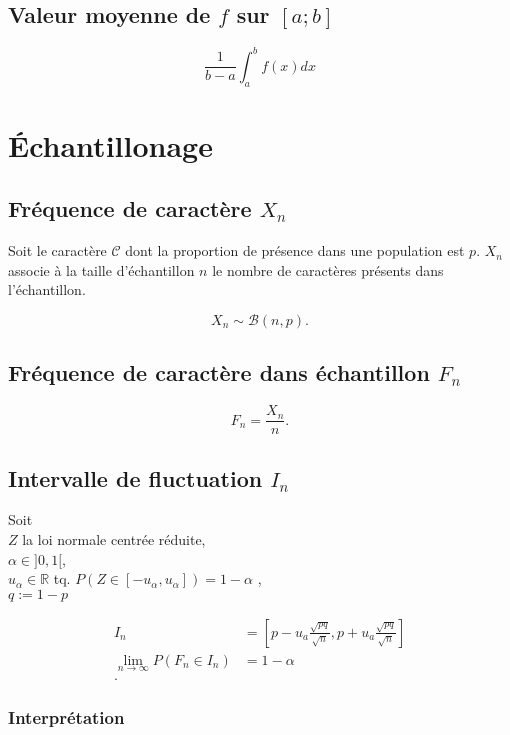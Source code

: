 \documentclass{article}
\newcommand{\R}{\mathds{R}}
\begin{document}
\subsection{Valeur moyenne de $f$ sur $[a; b]$}

\[\frac{1}{b-a}\int_a^b f(x)dx\]

\newpage\section{Échantillonage}

\subsection{Fréquence de caractère $X_{n}$}
Soit le caractère $\mathcal{C}$ dont la proportion de présence dans une population est $p$.
$X_{n}$ associe à la taille d'échantillon $n$ le nombre de caractères présents dans l'échantillon.

\[
	X_{n} \sim \mathcal{B}(n, p) 
.\]

\subsection{Fréquence de caractère dans échantillon $F_{n}$}

\[
	F_{n} = \frac{X_{n}}{n}
.\]

\subsection{Intervalle de fluctuation $I_n$}

Soit \\ $Z$ la loi normale centrée réduite, \\
$\alpha \in ]0, 1[$, \\
$u_{\alpha} \in \R$ tq. $P(Z \in [-u_{\alpha}, u_{\alpha}]) = 1 - \alpha$ ,\\
$q := 1-p$

\begin{align*}
	I_n &= \left[ p - u_{a} \frac{\sqrt{pq} }{\sqrt{n} }, p+u_{a} \frac{\sqrt{pq} }{\sqrt{n} } \right]  \\
	\lim_{n \to \infty} P(F_{n} \in I_{n}) &= 1 - \alpha \\
.\end{align*}


\subsubsection{Interprétation}
\end{document}
